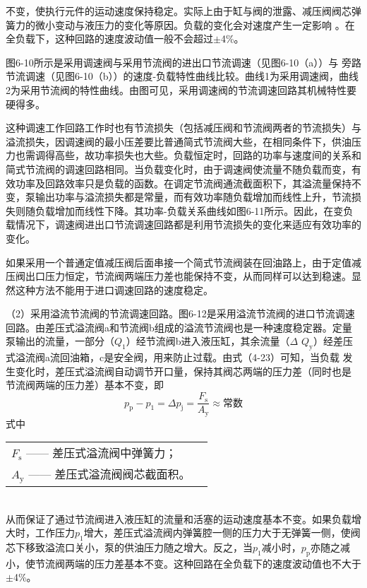 
\noindent 不变，使执行元件的运动速度保持稳定。实际上由于缸与阀的泄露、减压阀阀芯弹簧力的微小变动与液压力的变化等原因。负载的变化会对速度产生一定影响 。在全负载下，这种回路的速度波动值一般不会超过$\pm$4\%。

图6-10所示是采用调速阀与采用节流阀的进出口节流调速（见图6-10（a））与 旁路节流调速（见图6-10（b））的速度-负载特性曲线比较。曲线1为采用调速阀，曲线2为采用节流阀的特性曲线。由图可见，采用调速阀的节流调速回路其机械特性要硬得多。

这种调速工作回路工作时也有节流损失（包括减压阀和节流阀两者的节流损失）与溢流损失，因调速阀的最小压差要比普通简式节流阀大些，在相同条件下，供油压力也需调得高些，故功率损失也大些。负载恒定时，回路的功率与速度间的关系和简式节流阀的调速回路相同。当负载变化时，由于调速阀使流量不随负载而变，有效功率及回路效率只是负载的函数。在调定节流阀通流截面积下，其溢流量保持不变，泵输出功率与溢流损失都是常量，而有效功率随负载增加而线性上升，节流损失则随负载增加而线性下降。其功率-负载关系曲线如图6-11所示。因此，在变负载情况下，调速阀进出口节流调速回路都是利用节流损失的变化来适应有效功率的变化。

如果采用一个普通定值减压阀后面串接一个简式节流阀装在回油路上，由于定值减压阀出口压力恒定，节流阀两端压力差也能保持不变，从而同样可以达到稳速。显然这种方法不能用于进口调速回路的速度稳定。

（2）采用溢流节流阀的节流调速回路。图6-12是采用溢流节流阀的进口节流调速回路。由差压式溢流阀a和节流阀b组成的溢流节流阀也是一种速度稳定器。定量泵输出的流量，一部分（$Q_\text{1}$）经节流阀b进入液压缸，其余流量（$\Delta$ $Q_\text{y}$）经差压式溢流阀a流回油箱，c是安全阀，用来防止过载。由式（4-23）可知，当负载 发生变化时，差压式溢流阀自动调节开口量，保持其阀芯两端的压力差（同时也是 节流阀两端的压力差）基本不变，即
\begin{equation}
p_\text{p}-p_\text{1}=\Delta p_\text{j}=\frac{F_\text{s}}{A_\text{y}}\approx\text{常数}
\end{equation}
\noindent 式中\  
\begin{tabular}[t]{ll}
$F_\text{s}$ ——\hspace{1mm} 差压式溢流阀中弹簧力；\\
$A_\text{y}$ ——\hspace{1mm} 差压式溢流阀阀芯截面积。
\end{tabular}\\
从而保证了通过节流阀进入液压缸的流量和活塞的运动速度基本不变。如果负载增大时，工作压力$p_\text{1}$增大，差压式溢流阀内弹簧腔一侧的压力大于无弹簧一侧，使阀芯下移致溢流口关小，泵的供油压力随之增大。反之，当$p_\text{1}$减小时，$p_\text{p}$亦随之减小，使节流阀两端的压力差基本不变。这种回路在全负载下的速度波动值也不大于$\pm$4\%。

